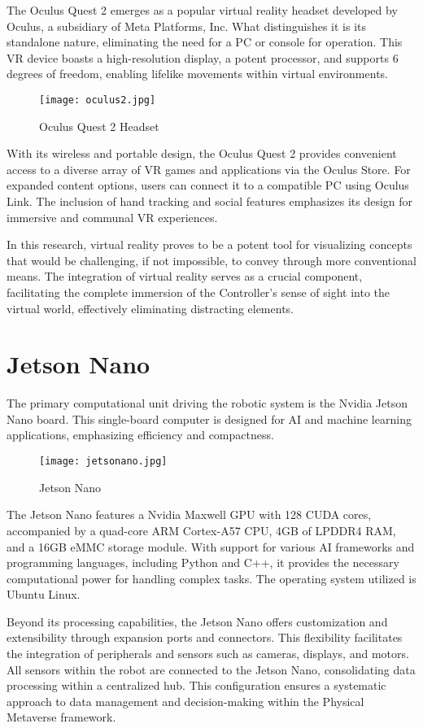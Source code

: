 \documentclass{Configuration_Files/PoliMi3i_thesis}
\begin{document}
The Oculus Quest 2 emerges as a popular virtual reality headset developed by Oculus, a subsidiary of Meta Platforms, Inc. What distinguishes it is its standalone nature, eliminating the need for a PC or console for operation. This VR device boasts a high-resolution display, a potent processor, and supports 6 degrees of freedom, enabling lifelike movements within virtual environments.
\begin{figure}[h]
    \centering
    \texttt{[image: oculus2.jpg]}
    \caption{Oculus Quest 2 Headset}
\end{figure}
With its wireless and portable design, the Oculus Quest 2 provides convenient access to a diverse array of VR games and applications via the Oculus Store. For expanded content options, users can connect it to a compatible PC using Oculus Link. The inclusion of hand tracking and social features emphasizes its design for immersive and communal VR experiences.

In this research, virtual reality proves to be a potent tool for visualizing concepts that would be challenging, if not impossible, to convey through more conventional means. The integration of virtual reality serves as a crucial component, facilitating the complete immersion of the Controller's sense of sight into the virtual world, effectively eliminating distracting elements.
\section{Jetson Nano}
The primary computational unit driving the robotic system is the Nvidia Jetson Nano board. This single-board computer is designed for AI and machine learning applications, emphasizing efficiency and compactness.
\begin{figure}[h]
    \centering
    \texttt{[image: jetsonano.jpg]}
    \caption{Jetson Nano}
\end{figure}
The Jetson Nano features a Nvidia Maxwell GPU with 128 CUDA cores, accompanied by a quad-core ARM Cortex-A57 CPU, 4GB of LPDDR4 RAM, and a 16GB eMMC storage module. With support for various AI frameworks and programming languages, including Python and C++, it provides the necessary computational power for handling complex tasks. The operating system utilized is Ubuntu Linux.

Beyond its processing capabilities, the Jetson Nano offers customization and extensibility through expansion ports and connectors. This flexibility facilitates the integration of peripherals and sensors such as cameras, displays, and motors. All sensors within the robot are connected to the Jetson Nano, consolidating data processing within a centralized hub. This configuration ensures a systematic approach to data management and decision-making within the Physical Metaverse framework.
\end{document}
